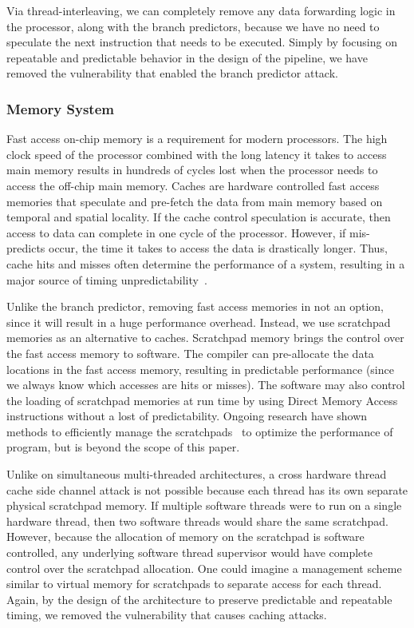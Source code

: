 \documentclass[times, 10pt,twocolumn]{article}
\begin{document}
Via thread-interleaving, we can completely remove any data forwarding logic in the processor, along with the branch predictors, because we have no need to speculate the next instruction that needs to be executed. Simply by focusing on repeatable and predictable behavior in the design of the pipeline, we have removed the vulnerability that enabled the branch predictor attack. 

\subsubsection {Memory System}
Fast access on-chip memory is a requirement for modern processors. The high clock speed of the processor combined with the long latency it takes to access main memory results in hundreds of cycles lost when the processor needs to access the off-chip main memory. Caches are hardware controlled fast access memories that speculate and pre-fetch the data from main memory based on temporal and spatial locality. If the cache control speculation is accurate, then access to data can complete in one cycle of the processor. However, if mis-predicts occur, the time it takes to access the data is drastically longer. Thus, cache hits and misses often determine the performance of a system, resulting in a major source of timing unpredictability~\cite{thiele:04:predictable}.

Unlike the branch predictor, removing fast access memories in not an option, since it will result in a huge performance overhead. Instead, we use scratchpad memories as an alternative to caches. Scratchpad memory brings the control over the fast access memory to software. The compiler can pre-allocate the data locations in the fast access memory, resulting in predictable performance (since we always know which accesses are hits or misses). The software may also control the loading of scratchpad memories at run time by using Direct Memory Access instructions without a lost of predictability. Ongoing research have shown methods to efficiently manage the scratchpads~\cite{avissar2002oma, Bandyopadhyay:EECS-2006-105, Patel:EECS-2008-115} to optimize the performance of program, but is beyond the scope of this paper. 

Unlike on simultaneous multi-threaded architectures, a cross hardware thread cache side channel attack is not possible because each thread has its own separate physical scratchpad memory. If multiple software threads were to run on a single hardware thread, then two software threads would share the same scratchpad. However, because the allocation of memory on the scratchpad is software controlled, any underlying software thread supervisor would have complete control over the scratchpad allocation. One could imagine a management scheme similar to virtual memory for scratchpads to separate access for each thread. Again, by the design of the architecture to preserve predictable and repeatable timing, we removed the vulnerability that causes caching attacks.
\end{document}
